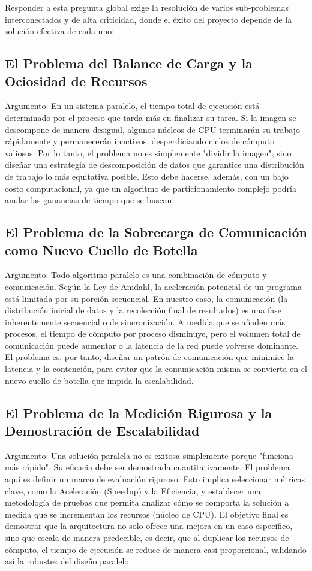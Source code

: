 \documentclass[fleqn,10pt]{article}
\begin{document}
Responder a esta pregunta global exige la resolución de varios sub-problemas interconectados y de alta criticidad, donde el éxito del proyecto depende de la solución efectiva de cada uno:

\subsection{El Problema del Balance de Carga y la Ociosidad de Recursos}
Argumento: En un sistema paralelo, el tiempo total de ejecución está determinado por el proceso que tarda más en finalizar su tarea. Si la imagen se descompone de manera desigual, algunos núcleos de CPU terminarán su trabajo rápidamente y permanecerán inactivos, desperdiciando ciclos de cómputo valiosos. Por lo tanto, el problema no es simplemente "dividir la imagen", sino diseñar una estrategia de descomposición de datos que garantice una distribución de trabajo lo más equitativa posible. Esto debe hacerse, además, con un bajo costo computacional, ya que un algoritmo de particionamiento complejo podría anular las ganancias de tiempo que se buscan.

\subsection{El Problema de la Sobrecarga de Comunicación como Nuevo Cuello de Botella}
Argumento: Todo algoritmo paralelo es una combinación de cómputo y comunicación. Según la Ley de Amdahl, la aceleración potencial de un programa está limitada por su porción secuencial. En nuestro caso, la comunicación (la distribución inicial de datos y la recolección final de resultados) es una fase inherentemente secuencial o de sincronización. A medida que se añaden más procesos, el tiempo de cómputo por proceso disminuye, pero el volumen total de comunicación puede aumentar o la latencia de la red puede volverse dominante. El problema es, por tanto, diseñar un patrón de comunicación que minimice la latencia y la contención, para evitar que la comunicación misma se convierta en el nuevo cuello de botella que impida la escalabilidad.

\subsection{El Problema de la Medición Rigurosa y la Demostración de Escalabilidad}
Argumento: Una solución paralela no es exitosa simplemente porque "funciona más rápido". Su eficacia debe ser demostrada cuantitativamente. El problema aquí es definir un marco de evaluación riguroso. Esto implica seleccionar métricas clave, como la Aceleración (Speedup) y la Eficiencia, y establecer una metodología de pruebas que permita analizar cómo se comporta la solución a medida que se incrementan los recursos (núcleo de CPU). El objetivo final es demostrar que la arquitectura no solo ofrece una mejora en un caso específico, sino que escala de manera predecible, es decir, que al duplicar los recursos de cómputo, el tiempo de ejecución se reduce de manera casi proporcional, validando así la robustez del diseño paralelo.
\end{document}
